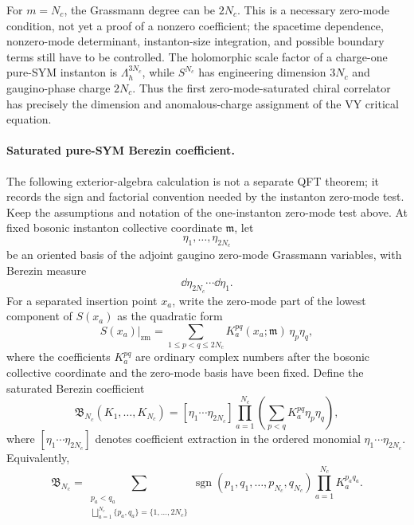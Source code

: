 For \(m=N_c\), the Grassmann degree can be \(2N_c\).  This is a necessary
zero-mode condition, not yet a proof of a nonzero coefficient; the
spacetime dependence, nonzero-mode determinant, instanton-size integration,
and possible boundary terms still have to be controlled.  The holomorphic
scale factor of a charge-one pure-SYM instanton is
\(\Lambda_h^{3N_c}\), while \(S^{N_c}\) has engineering dimension \(3N_c\)
and gaugino-phase charge \(2N_c\).  Thus the first zero-mode-saturated
chiral correlator has precisely the dimension and anomalous-charge assignment
of the VY critical equation.

\paragraph{Saturated pure-SYM Berezin coefficient.}
The following exterior-algebra calculation is not a separate QFT theorem; it
records the sign and factorial convention needed by the instanton
zero-mode test.  Keep the assumptions and notation of
the one-instanton zero-mode test above.  At fixed
bosonic instanton collective coordinate \(\mathfrak m\), let
\[
  \eta_1,\ldots,\eta_{2N_c}
\]
be an oriented basis of the adjoint gaugino zero-mode Grassmann variables,
with Berezin measure
\[
  \dd\eta_{2N_c}\cdots\dd\eta_1 .
\]
For a separated insertion point \(x_a\), write the zero-mode part of the
lowest component of \(S(x_a)\) as the quadratic form
\begin{equation}
  S(x_a)\big|_{\mathrm{zm}}
  =
  \sum_{1\leq p<q\leq 2N_c}
  K_a^{pq}(x_a;\mathfrak m)\,\eta_p\eta_q ,
  \label{eq:pure-sym-s-insertion-zero-mode-quadratic-form}
\end{equation}
where the coefficients \(K_a^{pq}\) are ordinary complex numbers after the
bosonic collective coordinate and the zero-mode basis have been fixed.  Define
the saturated Berezin coefficient
\begin{equation}
  \mathfrak B_{N_c}(K_1,\ldots,K_{N_c})
  =
  [\eta_1\cdots\eta_{2N_c}]
  \prod_{a=1}^{N_c}
  \left(
    \sum_{p<q}K_a^{pq}\eta_p\eta_q
  \right),
  \label{eq:pure-sym-saturated-berezin-coefficient}
\end{equation}
where \([\eta_1\cdots\eta_{2N_c}]\) denotes coefficient extraction in the
ordered monomial \(\eta_1\cdots\eta_{2N_c}\).  Equivalently,
\begin{equation}
  \mathfrak B_{N_c}
  =
  \sum_{\substack{p_a<q_a\\
        \bigsqcup_{a=1}^{N_c}\{p_a,q_a\}
        =\{1,\ldots,2N_c\}}}
  \operatorname{sgn}(p_1,q_1,\ldots,p_{N_c},q_{N_c})
  \prod_{a=1}^{N_c}K_a^{p_aq_a}.
  \label{eq:pure-sym-saturated-berezin-expansion}
\end{equation}
